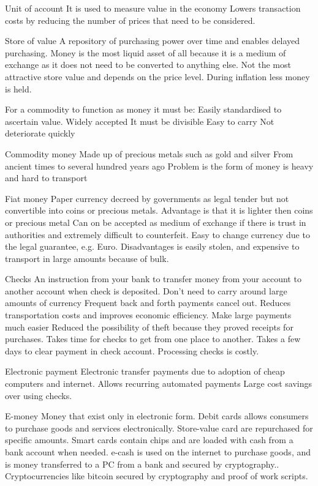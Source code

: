\documentclass[12pt]{examnotes}
\begin{document}
 Unit of account 
\rna It is used to measure value in the economy
\rna Lowers transaction costs by reducing the number of prices that need to be considered.

 Store of value
\rna A repository of purchasing power over time and enables delayed purchasing.
\rna Money is the most liquid asset of all because it is a medium of exchange as it does not need to be converted to anything else.
\rna Not the most attractive store value and depends on the price level.
\rna During inflation less money is held.

\vspace{6pt}
\ra For a commodity to function as money it must be:
 Easily standardised to ascertain value.
 Widely accepted
 It must be divisible
 Easy to carry
 Not deteriorate quickly

 Commodity money
\rna Made up of precious metals such as gold and silver
\rna From ancient times to several hundred years ago
\rna Problem is the form of money is heavy and hard to transport
 
 Fiat money
\rna Paper currency decreed by governments as legal tender but not convertible into coins or precious metals.
\rna Advantage is that it is lighter then coins or precious metal
\rna  Can on be accepted as medium of exchange if there is trust in authorities and extremely difficult to counterfeit.
\rna Easy to change currency due to the legal guarantee, e.g. Euro.
\rna Disadvantages is easily stolen, and expensive to transport in large amounts because of bulk.

 Checks
\rna An instruction from your bank to transfer money from your account to another account when check is deposited.
\rna Don't need to carry around large amounts of currency
\rna Frequent back and forth payments cancel out.
\rna Reduces transportation costs and improves economic efficiency.
\rna Make large payments much easier
\rna Reduced the possibility of theft because they proved receipts for purchases.
\rna Takes time for checks to get from one place to another.
\rna Takes a few days to clear payment in check account.
\rna Processing checks is costly.

 Electronic payment
\rna Electronic transfer payments due to adoption of cheap computers and internet.
\rna Allows recurring automated payments
\rna Large cost savings over using checks.

 E-money
\rna Money that exist only in electronic form.
\rna Debit cards allows consumers to purchase goods and services electronically.
\rna Store-value card are repurchased for specific amounts.
\rna Smart cards contain chips and are loaded with cash from a bank account when needed.
\rna e-cash is used on the internet to purchase goods, and is money transferred to a PC from a bank and secured by cryptography..
\rna Cryptocurrencies like bitcoin secured by cryptography and proof of work scripts. 
\end{document}
